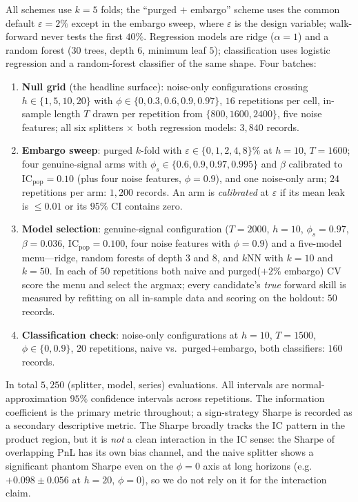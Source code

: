 \documentclass[11pt]{article}
\newcommand{\IC}{\mathrm{IC}}
\begin{document}
All schemes use $k=5$ folds; the ``purged $+$ embargo'' scheme uses the
common default $\varepsilon = 2\%$ except in the embargo sweep, where
$\varepsilon$ is the design variable; walk-forward never tests the first
$40\%$. Regression models are ridge ($\alpha=1$) and a random forest ($30$
trees, depth $6$, minimum leaf $5$); classification uses logistic regression
and a random-forest classifier of the same shape. Four batches:
\begin{enumerate}\itemsep2pt
\item \textbf{Null grid} (the headline surface): noise-only configurations
crossing $h \in \{1,5,10,20\}$ with $\phi \in \{0, 0.3, 0.6, 0.9, 0.97\}$,
$16$ repetitions per cell, in-sample length $T$ drawn per repetition from
$\{800, 1600, 2400\}$, five noise features; all six splitters $\times$ both
regression models: $3{,}840$ records.
\item \textbf{Embargo sweep}: purged $k$-fold with
$\varepsilon \in \{0, 1, 2, 4, 8\}\%$ at $h=10$, $T=1600$; four
genuine-signal arms with $\phi_s \in \{0.6, 0.9, 0.97, 0.995\}$ and $\beta$
calibrated to $\IC_{\mathrm{pop}} = 0.10$ (plus four noise features,
$\phi = 0.9$), and one noise-only arm; $24$ repetitions per arm:
$1{,}200$ records. An arm is \emph{calibrated} at $\varepsilon$ if its mean
leak is $\le 0.01$ or its $95\%$ CI contains zero.
\item \textbf{Model selection}: genuine-signal configuration ($T=2000$,
$h=10$, $\phi_s = 0.97$, $\beta = 0.036$, $\IC_{\mathrm{pop}} = 0.100$, four
noise features with $\phi=0.9$) and a five-model menu---ridge, random
forests of depth $3$ and $8$, and $k$NN with $k=10$ and $k=50$. In each of
$50$ repetitions both naive and purged($+2\%$ embargo) CV score the menu and
select the argmax; every candidate's \emph{true} forward skill is measured
by refitting on all in-sample data and scoring on the holdout: $50$
records.
\item \textbf{Classification check}: noise-only configurations at $h=10$,
$T=1500$, $\phi \in \{0, 0.9\}$, $20$ repetitions, naive vs.\
purged$+$embargo, both classifiers: $160$ records.
\end{enumerate}
In total $5{,}250$ (splitter, model, series) evaluations. All intervals are
normal-approximation $95\%$ confidence intervals across repetitions. The
information coefficient is the primary metric throughout; a sign-strategy
Sharpe is recorded as a secondary descriptive metric. The Sharpe broadly
tracks the IC pattern in the product region, but it is \emph{not} a clean
interaction in the IC sense: the Sharpe of overlapping PnL has its own bias
channel, and the naive splitter shows a significant phantom Sharpe even on
the $\phi=0$ axis at long horizons (e.g.\ $+0.098\pm0.056$ at $h{=}20$,
$\phi{=}0$), so we do not rely on it for the interaction claim.
\end{document}
